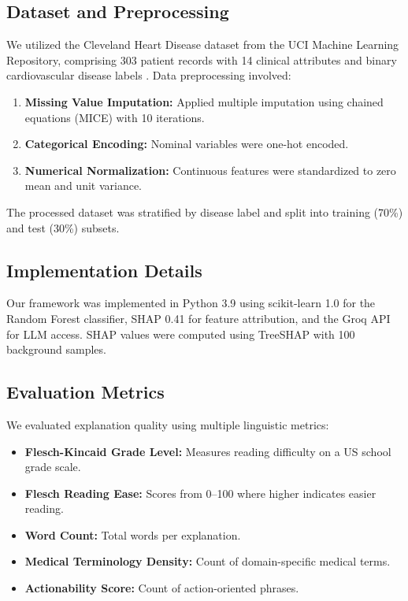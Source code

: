 \documentclass{ieeeaccess}
\begin{document}
\subsection{Dataset and Preprocessing}

We utilized the Cleveland Heart Disease dataset from the UCI Machine Learning Repository, comprising 303 patient records with 14 clinical attributes and binary cardiovascular disease labels \cite{ref55}. Data preprocessing involved:

\begin{enumerate}
\item \textbf{Missing Value Imputation:} Applied multiple imputation using chained equations (MICE) with 10 iterations.
\item \textbf{Categorical Encoding:} Nominal variables were one-hot encoded.
\item \textbf{Numerical Normalization:} Continuous features were standardized to zero mean and unit variance.
\end{enumerate}

The processed dataset was stratified by disease label and split into training (70\%) and test (30\%) subsets.

\subsection{Implementation Details}

Our framework was implemented in Python 3.9 using scikit-learn 1.0 for the Random Forest classifier, SHAP 0.41 for feature attribution, and the Groq API for LLM access. SHAP values were computed using TreeSHAP with 100 background samples.

\subsection{Evaluation Metrics}

We evaluated explanation quality using multiple linguistic metrics:

\begin{itemize}
\item \textbf{Flesch-Kincaid Grade Level:} Measures reading difficulty on a US school grade scale.
\item \textbf{Flesch Reading Ease:} Scores from 0--100 where higher indicates easier reading.
\item \textbf{Word Count:} Total words per explanation.
\item \textbf{Medical Terminology Density:} Count of domain-specific medical terms.
\item \textbf{Actionability Score:} Count of action-oriented phrases.
\end{itemize}
\end{document}
